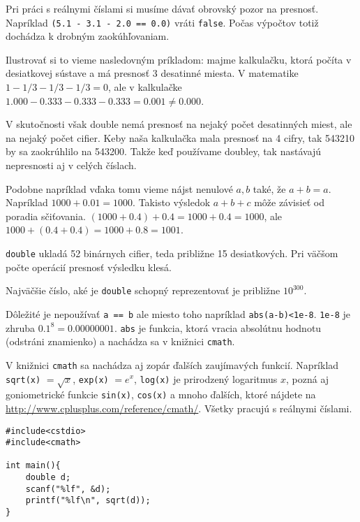 \medskip

Pri práci s reálnymi číslami si musíme dávať obrovský pozor na presnosť.
Napríklad \verb!(5.1 - 3.1 - 2.0 == 0.0)! vráti \verb!false!. Počas výpočtov totiž
dochádza k drobným zaokúhľovaniam.

Ilustrovať si to vieme nasledovným príkladom: majme kalkulačku, ktorá počíta v
desiatkovej sústave a má presnosť 3 desatinné miesta.  V matematike $1 - 1/3 -
1/3 - 1/3 = 0$, ale v kalkulačke $1.000 - 0.333 - 0.333 - 0.333 = 0.001 \neq
0.000$. 

V skutočnosti však double nemá presnosť na nejaký počet desatinných miest, ale
na nejaký počet cifier. Keby naša kalkulačka mala presnosť na 4 cifry, tak
543210 by sa zaokrúhlilo na 543200. Takže keď používame doubley, tak nastávajú
nepresnosti aj v celých číslach.

Podobne napríklad vďaka tomu vieme nájst nenulové $a,b$ také, že $a + b = a$.
Napríklad $1000 + 0.01 = 1000$. Takisto výsledok $a + b + c$ môže závisieť od
poradia sčiťovania. $(1000 + 0.4) + 0.4 = 1000 + 0.4 = 1000$, ale $1000 + (0.4
+ 0.4) = 1000 + 0.8 = 1001$.

\medskip

\verb!double! ukladá 52 binárnych cifier, teda približne 15 desiatkových.  Pri
väčšom počte operácií presnosť výsledku klesá.

Najväčšie číslo, aké je \verb!double! schopný reprezentovať je približne
$10^{300}$.

\medskip

Dôležité je nepoužívať \verb!a == b! ale miesto toho napríklad
\verb!abs(a-b)<1e-8!.  \verb!1e-8! je zhruba $0.1^8 = 0.00000001$. \verb!abs!
je funkcia, ktorá vracia absolútnu hodnotu (odstráni znamienko) a nachádza sa v
knižnici \verb!cmath!.


V knižnici \verb!cmath! sa nachádza aj zopár ďalších zaujímavých funkcií. 
Napríklad \verb!sqrt(x)! $= \sqrt{x}$, \verb!exp(x)! $= e^x$, \verb!log(x)! je prirodzený
logaritmus $x$, pozná aj goniometrické funkcie \verb!sin(x)!, \verb!cos(x)! a mnoho ďalších,
ktoré nájdete na \url{http://www.cplusplus.com/reference/cmath/}. 
Všetky pracujú s reálnymi číslami.

\begin{lstlisting}
#include<cstdio>
#include<cmath>

int main(){
    double d;
    scanf("%lf", &d);
    printf("%lf\n", sqrt(d));
}
\end{lstlisting}



